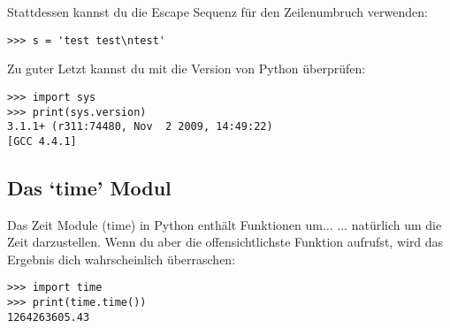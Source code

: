 Stattdessen kannst du die Escape Sequenz für den Zeilenumbruch verwenden:
\begin{Verbatim}[frame=single]
>>> s = 'test test\ntest'
\end{Verbatim}

\noindent
Zu guter Letzt kannst du mit  die Version von Python überprüfen:

\begin{Verbatim}[frame=single]
>>> import sys
>>> print(sys.version)
3.1.1+ (r311:74480, Nov  2 2009, 14:49:22) 
[GCC 4.4.1]
\end{Verbatim}

\subsection*{Das `time' Modul}

Das Zeit Module (time) in Python enthält Funktionen um$\ldots$ ... natürlich um die Zeit darzustellen. Wenn du aber die offensichtlichste Funktion  aufrufst, wird das Ergebnis dich wahrscheinlich überraschen:

\begin{Verbatim}[frame=single]
>>> import time
>>> print(time.time())
1264263605.43
\end{Verbatim}


